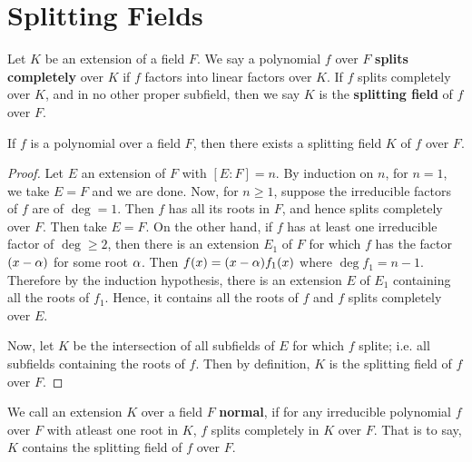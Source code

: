 \section{Splitting Fields}

\begin{definition}
    Let $K$ be an extension of a field  $F$. We say a polynomial  $f$ over  $F$
     \textbf{splits completely} over $K$ if  $f$ factors into linear factors
     over  $K$. If  $f$ splits completely over  $K$, and in no other proper
     subfield, then we say  $K$ is the  \textbf{splitting field} of $f$ over
     $F$.
\end{definition}

\begin{theorem}\label{1.4.1}
    If $f$ is a polynomial over a field  $F$, then there exists a splitting
    field  $K$ of  $f$ over  $F$.
\end{theorem}
\begin{proof}
    Let $E$ an extension of  $F$ with  $[E:F]=n$. By induction on $n$, for
    $n=1$, we take  $E=F$ and we are done. Now, for  $n \geq 1$, suppose the
    irreducible factors of  $f$ are of $\deg=1$. Then $f$ has all its roots in
    $F$, and hence splits completely over $F$. Then take $E=F$. On the other
    hand, if  $f$ has at least one irreducible factor of $\deg \geq 2$, then
    there is an extension $E_1$ of $F$ for which $f$ has the factor $(x-\alpha)$ for
    some root $\alpha$. Then $f(x)=(x-\alpha)f_1(x)$ where $\deg{f_1}=n-1$. Therefore by
    the induction hypothesis, there is an extension $E$ of  $E_1$ containing all
    the roots of $f_1$. Hence, it contains all the roots of $f$ and  $f$ splits
    completely over  $E$.

    Now, let $K$ be the intersection of all subfields of $E$ for which $f$
    splite; i.e. all subfields containing the roots of $f$. Then by definition,
     $K$ is the splitting field of  $f$ over  $F$.
\end{proof}

\begin{definition}
    We call an extension $K$ over a field  $F$  \textbf{normal}, if for any
    irreducible polynomial $f$ over $F$ with atleast one root in $K$, $f$ splits
    completely in  $K$ over $F$. That is to say, $K$ contains the splitting
    field of  $f$ over  $F$.
\end{definition}

